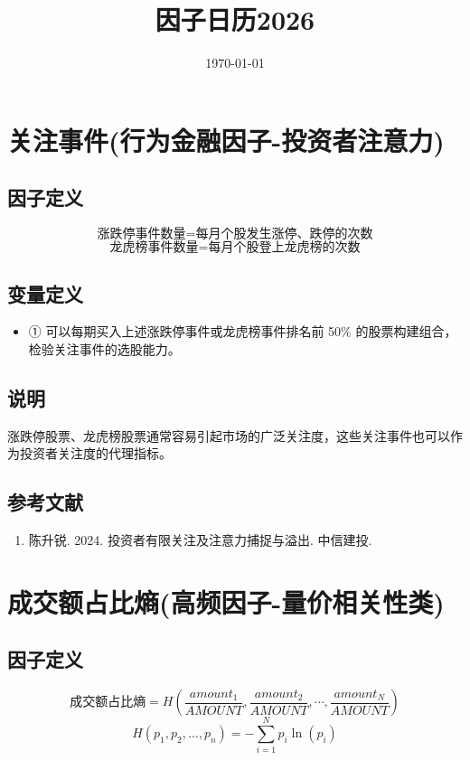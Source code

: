 \documentclass{article}
\title{因子日历2026}
\date{\today}
\begin{document}
\maketitle

\section{关注事件(行为金融因子-投资者注意力)}

\subsection{因子定义}
\begin{equation}
    \text{涨跌停事件数量} = \text{每月个股发生涨停、跌停的次数}
\end{equation}
\begin{equation}
    \text{龙虎榜事件数量} = \text{每月个股登上龙虎榜的次数}
\end{equation}

\subsection{变量定义}
\begin{itemize}
    \item ① 可以每期买入上述涨跌停事件或龙虎榜事件排名前 50\% 的股票构建组合，检验关注事件的选股能力。
\end{itemize}

\subsection{说明}
涨跌停股票、龙虎榜股票通常容易引起市场的广泛关注度，这些关注事件也可以作为投资者关注度的代理指标。

\subsection{参考文献}
\begin{enumerate}
    \item 陈升锐. 2024. 投资者有限关注及注意力捕捉与溢出. 中信建投.
\end{enumerate}

\section{成交额占比熵(高频因子-量价相关性类)}

\subsection{因子定义}
\begin{equation}
    \text{成交额占比熵} = H(\frac{amount_1}{AMOUNT},\frac{amount_2}{AMOUNT},\cdots,\frac{amount_N}{AMOUNT})
\end{equation}
\begin{equation}
    H(p_1, p_2, \dots, p_n) = -\sum_{i=1}^N p_i \ln(p_i)
\end{equation}
\end{document}
